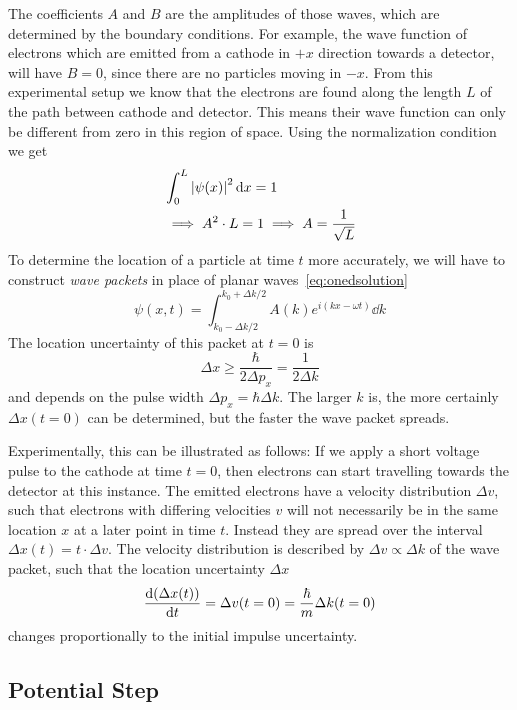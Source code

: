 \documentclass[../../script.tex]{subfiles}
\begin{document}
The coefficients $A$ and $B$ are the amplitudes of those waves, which are determined by the boundary conditions.
For example, the wave function of electrons which are emitted from a cathode in $+x$ direction towards a detector, will have $B = 0$, since there are no particles moving in $-x$.
From this experimental setup we know that the electrons are found along the length $L$ of the path between cathode and detector. This means their wave function can only be different from zero in this region of space.
Using the normalization condition we get 
\begin{align*}
	&\int_0^L \abs{\psi(x)}^2 \dd{x} = 1 \\
	&\implies A^2 \cdot L = 1 \implies A = \frac{1}{\sqrt{L}}
\end{align*}
To determine the location of a particle at time $t$ more accurately, we will have to construct \textit{wave packets} in place of planar waves~\eqref{eq:onedsolution}
\begin{equation}
	\psi(x, t) = \int_{k_0 - \Delta k / 2}^{k_0 + \Delta k / 2} A(k) e^{i(kx - \omega t)} \dd{k}
\end{equation}
The location uncertainty of this packet at $t = 0$ is 
\[
	\Delta x \ge \frac{\hbar}{2 \Delta p_x} = \frac{1}{2\Delta k}
\]
and depends on the pulse width $\Delta p_x = \hbar \Delta k$. The larger $k$ is, the more certainly $\Delta x(t = 0)$ can be determined, but the faster the wave packet spreads.

Experimentally, this can be illustrated as follows: If we apply a short voltage pulse to the cathode at time $t = 0$, then electrons can start travelling towards the detector at this instance.
The emitted electrons have a velocity distribution $\Delta v$, such that electrons with differing velocities $v$ will not necessarily be in the same location $x$ at a later point in time $t$.
Instead they are spread over the interval $\Delta x(t) = t \cdot \Delta v$. The velocity distribution is described by $\Delta v \propto \Delta k$ of the wave packet, such that the location uncertainty $\Delta x$ 
\[
	\dv{(\Delta x(t))}{t} = \Delta v(t = 0) = \frac{\hbar}{m} \Delta k(t = 0)
\]
changes proportionally to the initial impulse uncertainty.

\subsection{Potential Step}
\end{document}
